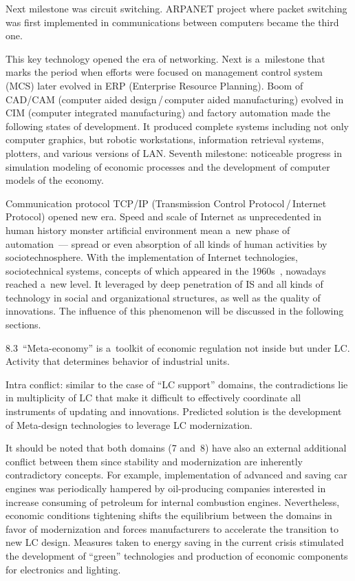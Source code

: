 \begin{multicols}{2}
 Next milestone was circuit switching. ARPANET project where packet switching was
 first implemented
in communications between computers became the third one.


 This key technology opened the era of networking. Next is a~milestone that marks the period when
efforts were focused on management control system (MCS) later evolved in ERP
(Enterprise Resource Planning). Boom of CAD/CAM
(computer aided design\,/\,computer aided manufacturing) evolved in CIM (computer integrated
manufacturing) and factory automation made the following states of development. It produced complete
systems including not only computer graphics, but robotic workstations, information retrieval systems,
plotters, and various versions of LAN. Seventh milestone: noticeable progress in simulation modeling of
economic processes and the development of computer models of the economy.

 Communication protocol TCP/IP (Transmission Control Protocol\,/\,Internet
 Protocol) opened new era. Speed and scale of Internet as unprecedented in human
history monster artificial environment mean a~new phase of automation~--- spread or even absorption of all
kinds of human activities by sociotechnosphere. With the implementation of Internet technologies,
 sociotechnical systems, concepts of which appeared in the 1960s~\cite{4-sor},
nowadays reached a~new level. It leveraged by deep penetration of IS and all kinds of
technology in social and organizational structures, as well as the quality of innovations.
The influence of this phenomenon will be discussed in the following sections.

 8.3\ ``Meta-economy'' is a~toolkit of economic regulation not inside but under LC. Activity that
determines behavior of industrial units.

\pagebreak

 Intra conflict: similar to the case of ``LC support'' domains, the contradictions lie in multiplicity of
LC that make it difficult to effectively coordinate all instruments of updating and innovations. Predicted
solution is the development of Meta-design technologies to leverage LC modernization.


 It should be noted that both domains (7 and~8) have also an external additional conflict between them
since stability and modernization are inherently contradictory concepts. For example, implementation of
advanced and saving car engines was periodically hampered by oil-producing companies interested in
increase consuming of petroleum for internal combustion engines. Nevertheless, economic conditions
tightening shifts the equilibrium between the domains in favor of modernization and forces manufacturers
to accelerate the transition to new LC design. Measures taken to energy saving in the current crisis
stimulated the development of ``green'' technologies and production of economic components for
electronics and lighting.


\end{multicols}
